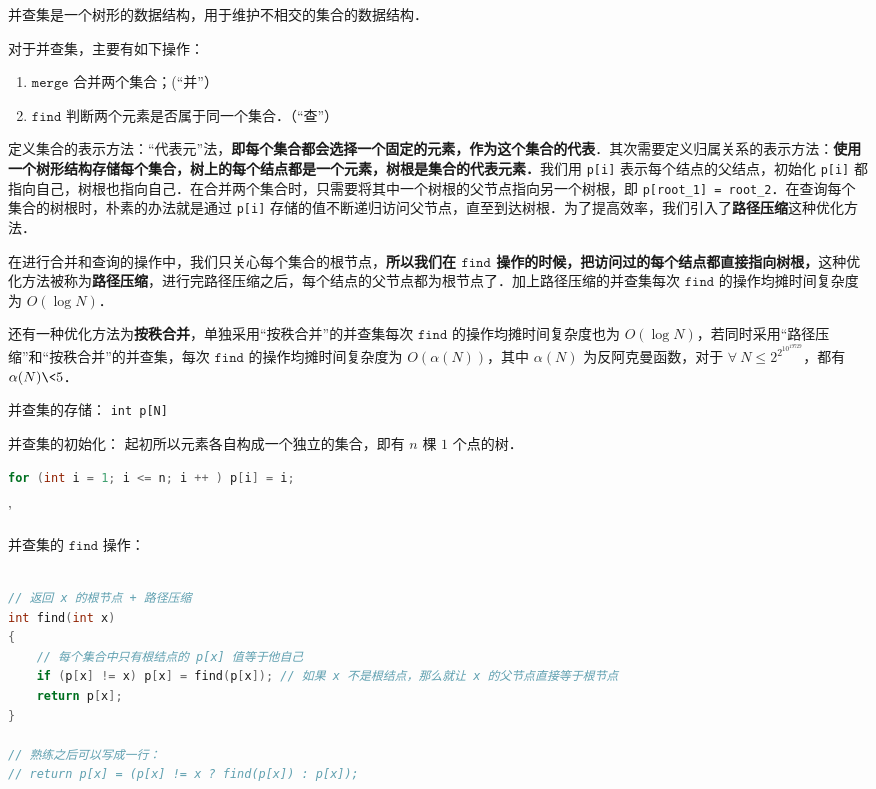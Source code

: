 
并查集是一个树形的数据结构，用于维护不相交的集合的数据结构．

对于并查集，主要有如下操作：
\begin{enumerate}
\item $\mathtt{merge}$ 合并两个集合；(“并”）

\item $\mathtt{find}$ 判断两个元素是否属于同一个集合．（“查”）
\end{enumerate}

定义集合的表示方法：“代表元”法，\textbf{即每个集合都会选择一个固定的元素，作为这个集合的代表}．其次需要定义归属关系的表示方法：\textbf{使用一个树形结构存储每个集合，树上的每个结点都是一个元素，树根是集合的代表元素．}我们用 \verb|p[i]| 表示每个结点的父结点，初始化 \verb|p[i]| 都指向自己，树根也指向自己．在合并两个集合时，只需要将其中一个树根的父节点指向另一个树根，即 \verb|p[root_1] = root_2|．在查询每个集合的树根时，朴素的办法就是通过 \verb|p[i]| 存储的值不断递归访问父节点，直至到达树根．为了提高效率，我们引入了\textbf{路径压缩}这种优化方法．

在进行合并和查询的操作中，我们只关心每个集合的根节点，\textbf{所以我们在 $\mathtt{find}$ 操作的时候，把访问过的每个结点都直接指向树根，}这种优化方法被称为\textbf{路径压缩}，进行完路径压缩之后，每个结点的父节点都为根节点了．加上路径压缩的并查集每次 $\mathtt{find}$ 的操作均摊时间复杂度为 $O(\log N)$．

还有一种优化方法为\textbf{按秩合并}，单独采用“按秩合并”的并查集每次 $\mathtt{find}$ 的操作均摊时间复杂度也为 $O(\log N)$，若同时采用“路径压缩”和“按秩合并”的并查集，每次 $\mathtt{find}$ 的操作均摊时间复杂度为 $O(\alpha(N))$，其中 $\alpha(N)$ 为反阿克曼函数，对于 $\forall \ N \leq 2^{2^{10^{19729}}}$，都有 $\alpha(N) \< 5$．

并查集的存储：
\verb|int p[N]|

并查集的初始化：
起初所以元素各自构成一个独立的集合，即有 $n$ 棵 $1$ 个点的树．
\begin{lstlisting}[language=cpp]
for (int i = 1; i <= n; i ++ ) p[i] = i;
\end{lstlisting}'

并查集的 $\mathtt{find}$ 操作：
\begin{lstlisting}[language=cpp]

// 返回 x 的根节点 + 路径压缩
int find(int x)
{
    // 每个集合中只有根结点的 p[x] 值等于他自己
    if (p[x] != x) p[x] = find(p[x]); // 如果 x 不是根结点，那么就让 x 的父节点直接等于根节点
    return p[x];
}

// 熟练之后可以写成一行：
// return p[x] = (p[x] != x ? find(p[x]) : p[x]);
\end{lstlisting}

